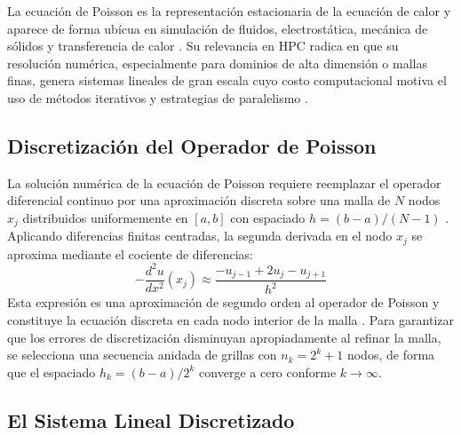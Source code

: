 La ecuación de Poisson es la representación estacionaria de la ecuación de calor y
aparece de forma ubícua en simulación de fluidos, electrostática, mecánica de sólidos y
transferencia de calor \parencite{elman2005finite}. Su relevancia en HPC radica en que su
resolución numérica, especialmente para dominios de alta dimensión o mallas finas, genera
sistemas lineales de gran escala cuyo costo computacional motiva el uso de métodos
iterativos y estrategias de paralelismo \parencite{burkardt2011jacobi}.

\subsection{Discretización del Operador de Poisson}

La solución numérica de la ecuación de Poisson requiere reemplazar el operador
diferencial continuo por una aproximación discreta sobre una malla de $N$ nodos $x_j$
distribuidos uniformemente en $[a, b]$ con espaciado $h = (b-a)/(N-1)$
\parencite{burkardt2011jacobi}. Aplicando diferencias finitas centradas, la segunda derivada en
el nodo $x_j$ se aproxima mediante el cociente de diferencias:
\begin{equation}
    -\frac{d^2u}{dx^2}(x_j) \approx \frac{-u_{j-1} + 2u_j - u_{j+1}}{h^2}
    \label{eq:fd_stencil}
\end{equation}
Esta expresión es una aproximación de segundo orden al operador de Poisson y constituye
la ecuación discreta en cada nodo interior de la malla \parencite{burkardt2011jacobi}. Para
garantizar que los errores de discretización disminuyan apropiadamente al refinar la
malla, se selecciona una secuencia anidada de grillas con $n_k = 2^k + 1$ nodos, de
forma que el espaciado $h_k = (b-a)/2^k$ converge a cero conforme $k \to \infty$.

\subsection{El Sistema Lineal Discretizado}

